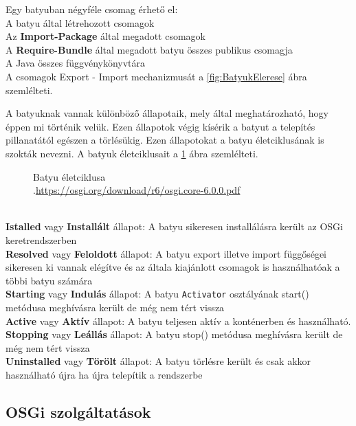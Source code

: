 Egy batyuban négyféle csomag érhető el:
\\A batyu által létrehozott csomagok
\\Az \textbf{Import-Package} által megadott csomagok
\\A \textbf{Require-Bundle} által megadott batyu összes publikus csomagja
\\A Java összes függvénykönyvtára
\\A csomagok Export - Import mechanizmusát a \ref{fig:BatyukElerese} ábra szemlélteti. 

\pagebreak


 A batyuknak vannak különböző állapotaik, mely által meghatározható, hogy éppen mi történik velük. Ezen állapotok végig kísérik a batyut a telepítés pillanatától egészen a törlésükig. Ezen állapotokat a batyu életciklusának is szokták nevezni. A batyuk életciklusait a \ref{fig:BatyukEletciklusa} ábra szemlélteti.
\\
\begin{figure}[h!]
  \centering
  \caption[Batyuk eletciklusa]%
  {Batyu életciklusa\\
  {\white .}\hfill\url{https://osgi.org/download/r6/osgi.core-6.0.0.pdf}}
  \label{fig:BatyukEletciklusa}
\end{figure}
\\\textbf{Istalled} vagy \textbf{Installált} állapot: A batyu sikeresen installálásra került az OSGi keretrendszerben
\\\textbf{Resolved} vagy \textbf{Feloldott} állapot: A batyu export illetve import függőségei sikeresen ki vannak elégítve és az általa kiajánlott csomagok is használhatóak a többi batyu számára
\\\textbf{Starting} vagy \textbf{Indulás} állapot: A batyu \texttt{Activator} osztályának start() metódusa meghívásra került de még nem tért vissza
\\\textbf{Active} vagy \textbf{Aktív} állapot: A batyu teljesen aktív a konténerben és használható.
\\\textbf{Stopping} vagy \textbf{Leállás} állapot: A batyu stop() metódusa meghívásra került de még nem tért vissza
\\\textbf{Uninstalled} vagy \textbf{Törölt} állapot: A batyu törlésre került és csak akkor használható újra ha újra telepítik a rendszerbe

\subsection{OSGi szolgáltatások}

